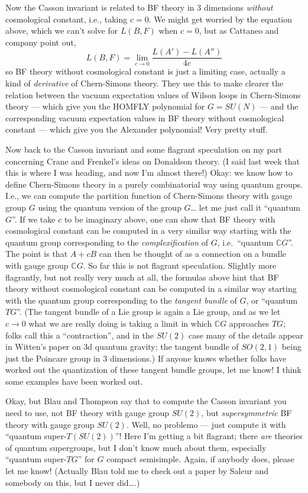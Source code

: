 \documentclass{article}
\begin{document}
Now the Casson invariant is related to BF theory in 3 dimensions
\emph{without} cosmological constant, i.e., taking \(c = 0\). We might
get worried by the equation above, which we can't solve for \(L(B,F)\)
when \(c = 0\), but as Cattaneo and company point out,
\[L(B,F) = \lim_{c\to0}\frac{L(A')-L(A'')}{4c}\] so BF theory without
cosmological constant is just a limiting case, actually a kind of
\emph{derivative} of Chern-Simons theory. They use this to make clearer
the relation between the vacuum expectation values of Wilson loops in
Chern-Simons theory --- which give you the HOMFLY polynomial for
\(G = SU(N)\) --- and the corresponding vacuum expectation values in BF
theory without cosmological constant --- which give you the Alexander
polynomial! Very pretty stuff.

Now back to the Casson invariant and some flagrant speculation on my
part concerning Crane and Frenkel's ideas on Donaldson theory. (I said
last week that this is where I was heading, and now I'm almost there!)
Okay: we know how to define Chern-Simons theory in a purely
combinatorial way using quantum groups. I.e., we can compute the
partition function of Chern-Simons theory with gauge group \(G\) using
the quantum version of the group \(G\)\ldots{} let me just call it
``quantum \(G\)''. If we take \(c\) to be imaginary above, one can show
that BF theory with cosmological constant can be computed in a very
similar way starting with the quantum group corresponding to the
\emph{complexification} of \(G\), i.e.~``quantum \(\mathbb{C}G\)''. The
point is that \(A+cB\) can then be thought of as a connection on a
bundle with gauge group \(\mathbb{C}G\). So far this is not flagrant
speculation. Slightly more flagrantly, but not really very much at all,
the formulas above hint that BF theory without cosmological constant can
be computed in a similar way starting with the quantum group
corresponding to the \emph{tangent bundle} of \(G\), or ``quantum
\(TG\)''. (The tangent bundle of a Lie group is again a Lie group, and
as we let \(c \to 0\) what we are really doing is taking a limit in
which \(\mathbb{C}G\) approaches \(TG\); folks call this a
``contraction'', and in the \(SU(2)\) case many of the details appear in
Witten's paper on 3d quantum gravity; the tangent bundle of \(SO(2,1)\)
being just the Poincare group in 3 dimensions.) If anyone knows whether
folks have worked out the quantization of these tangent bundle groups,
let me know! I think some examples have been worked out.

Okay, but Blau and Thompson say that to compute the Casson invariant you
need to use, not BF theory with gauge group \(SU(2)\), but
\emph{supersymmetric} BF theory with gauge group \(SU(2)\). Well, no
problemo --- just compute it with ``quantum super-\(T(SU(2))\)''! Here
I'm getting a bit flagrant; there \emph{are} theories of quantum
supergroups, but I don't know much about them, especially ``quantum
super-\(TG\)'' for \(G\) compact semisimple. Again, if anybody does,
please let me know! (Actually Blau told me to check out a paper by
Saleur and somebody on this, but I never did\ldots.)
\end{document}
